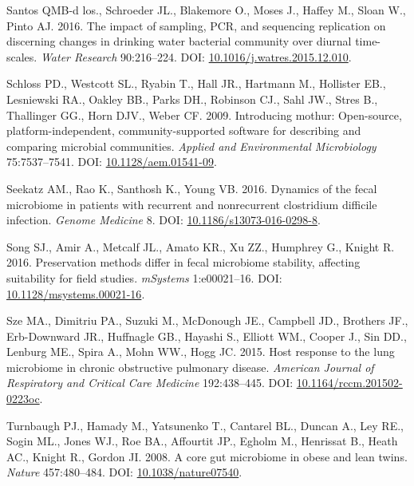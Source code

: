 \documentclass[11pt,]{article}
\begin{document}
\hypertarget{ref-BautistadelosSantos2016}{}
Santos QMB-d los., Schroeder JL., Blakemore O., Moses J., Haffey M.,
Sloan W., Pinto AJ. 2016. The impact of sampling, PCR, and sequencing
replication on discerning changes in drinking water bacterial community
over diurnal time-scales. \emph{Water Research} 90:216--224. DOI:
\href{https://doi.org/10.1016/j.watres.2015.12.010}{10.1016/j.watres.2015.12.010}.

\hypertarget{ref-mothur_schloss_2009}{}
Schloss PD., Westcott SL., Ryabin T., Hall JR., Hartmann M., Hollister
EB., Lesniewski RA., Oakley BB., Parks DH., Robinson CJ., Sahl JW.,
Stres B., Thallinger GG., Horn DJV., Weber CF. 2009. Introducing mothur:
Open-source, platform-independent, community-supported software for
describing and comparing microbial communities. \emph{Applied and
Environmental Microbiology} 75:7537--7541. DOI:
\href{https://doi.org/10.1128/aem.01541-09}{10.1128/aem.01541-09}.

\hypertarget{ref-erin_seekatz_2016}{}
Seekatz AM., Rao K., Santhosh K., Young VB. 2016. Dynamics of the fecal
microbiome in patients with recurrent and nonrecurrent clostridium
difficile infection. \emph{Genome Medicine} 8. DOI:
\href{https://doi.org/10.1186/s13073-016-0298-8}{10.1186/s13073-016-0298-8}.

\hypertarget{ref-preservation_Song_2016}{}
Song SJ., Amir A., Metcalf JL., Amato KR., Xu ZZ., Humphrey G., Knight
R. 2016. Preservation methods differ in fecal microbiome stability,
affecting suitability for field studies. \emph{mSystems} 1:e00021--16.
DOI:
\href{https://doi.org/10.1128/msystems.00021-16}{10.1128/msystems.00021-16}.

\hypertarget{ref-Sze2015}{}
Sze MA., Dimitriu PA., Suzuki M., McDonough JE., Campbell JD., Brothers
JF., Erb-Downward JR., Huffnagle GB., Hayashi S., Elliott WM., Cooper
J., Sin DD., Lenburg ME., Spira A., Mohn WW., Hogg JC. 2015. Host
response to the lung microbiome in chronic obstructive pulmonary
disease. \emph{American Journal of Respiratory and Critical Care
Medicine} 192:438--445. DOI:
\href{https://doi.org/10.1164/rccm.201502-0223oc}{10.1164/rccm.201502-0223oc}.

\hypertarget{ref-Turnbaugh2008}{}
Turnbaugh PJ., Hamady M., Yatsunenko T., Cantarel BL., Duncan A., Ley
RE., Sogin ML., Jones WJ., Roe BA., Affourtit JP., Egholm M., Henrissat
B., Heath AC., Knight R., Gordon JI. 2008. A core gut microbiome in
obese and lean twins. \emph{Nature} 457:480--484. DOI:
\href{https://doi.org/10.1038/nature07540}{10.1038/nature07540}.
\end{document}
